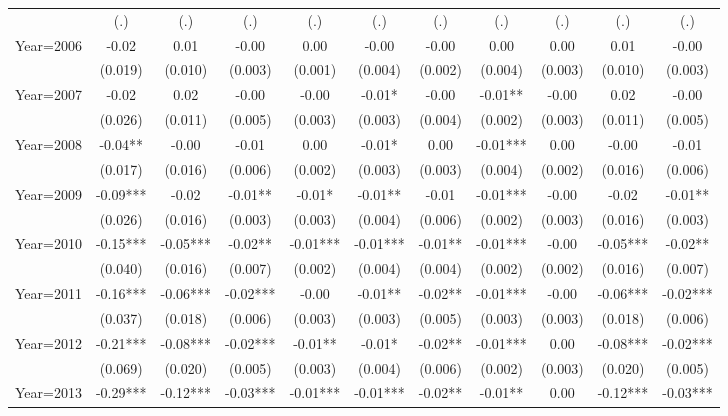 {\begin{tabular}{l*{10}{c}}
                    &   (.)   &   (.)   &   (.)   &   (.)   &   (.)   &   (.)   &   (.)   &   (.)   &   (.)   &   (.)   \\
Year=2006           & -0.02   &  0.01   & -0.00   &  0.00   & -0.00   & -0.00   &  0.00   &  0.00   &  0.01   & -0.00   \\
                    &(0.019)   &(0.010)   &(0.003)   &(0.001)   &(0.004)   &(0.002)   &(0.004)   &(0.003)   &(0.010)   &(0.003)   \\
Year=2007           & -0.02   &  0.02   & -0.00   & -0.00   & -0.01*  & -0.00   & -0.01** & -0.00   &  0.02   & -0.00   \\
                    &(0.026)   &(0.011)   &(0.005)   &(0.003)   &(0.003)   &(0.004)   &(0.002)   &(0.003)   &(0.011)   &(0.005)   \\
Year=2008           & -0.04** & -0.00   & -0.01   &  0.00   & -0.01*  &  0.00   & -0.01***&  0.00   & -0.00   & -0.01   \\
                    &(0.017)   &(0.016)   &(0.006)   &(0.002)   &(0.003)   &(0.003)   &(0.004)   &(0.002)   &(0.016)   &(0.006)   \\
Year=2009           & -0.09***& -0.02   & -0.01** & -0.01*  & -0.01** & -0.01   & -0.01***& -0.00   & -0.02   & -0.01** \\
                    &(0.026)   &(0.016)   &(0.003)   &(0.003)   &(0.004)   &(0.006)   &(0.002)   &(0.003)   &(0.016)   &(0.003)   \\
Year=2010           & -0.15***& -0.05***& -0.02** & -0.01***& -0.01***& -0.01** & -0.01***& -0.00   & -0.05***& -0.02** \\
                    &(0.040)   &(0.016)   &(0.007)   &(0.002)   &(0.004)   &(0.004)   &(0.002)   &(0.002)   &(0.016)   &(0.007)   \\
Year=2011           & -0.16***& -0.06***& -0.02***& -0.00   & -0.01** & -0.02** & -0.01***& -0.00   & -0.06***& -0.02***\\
                    &(0.037)   &(0.018)   &(0.006)   &(0.003)   &(0.003)   &(0.005)   &(0.003)   &(0.003)   &(0.018)   &(0.006)   \\
Year=2012           & -0.21***& -0.08***& -0.02***& -0.01** & -0.01*  & -0.02** & -0.01***&  0.00   & -0.08***& -0.02***\\
                    &(0.069)   &(0.020)   &(0.005)   &(0.003)   &(0.004)   &(0.006)   &(0.002)   &(0.003)   &(0.020)   &(0.005)   \\
Year=2013           & -0.29***& -0.12***& -0.03***& -0.01***& -0.01***& -0.02** & -0.01** &  0.00   & -0.12***& -0.03***\\

\end{tabular}}
